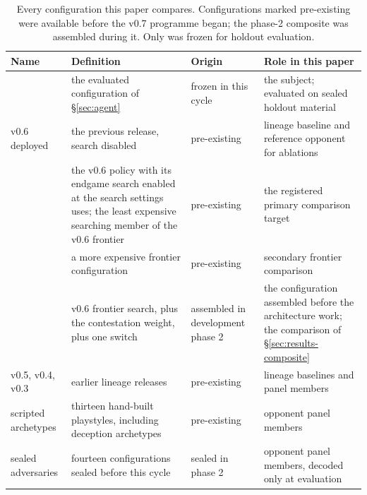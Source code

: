 \begin{table}[!ht]
\centering
\caption{Every configuration this paper compares. Configurations marked pre-existing were available
before the v0.7 programme began; the phase-2 composite was assembled during it. Only \sestina{} was
frozen for holdout evaluation.}
\label{tab:configs}
\tabfont
\begin{tabularx}{\linewidth}{@{}l L l L@{}}
\toprule
Name & Definition & Origin & Role in this paper \\
\midrule
\sestina{} & the evaluated configuration of \S\ref{sec:agent} & frozen in this cycle &
the subject; evaluated on sealed holdout material \\
v0.6 deployed & the previous release, search disabled & pre-existing &
lineage baseline and reference opponent for ablations \\
\fcheap{} & the v0.6 policy with its endgame search enabled at the search settings \sestina{}
uses; the least expensive searching member of the v0.6 frontier & pre-existing &
the registered primary comparison target \\
\fmid{} & a more expensive frontier configuration & pre-existing &
secondary frontier comparison \\
\composite{} & v0.6 frontier search, plus the contestation weight, plus one switch &
assembled in development phase 2 & the configuration assembled before the architecture work; the
comparison of \S\ref{sec:results-composite} \\
v0.5, v0.4, v0.3 & earlier lineage releases & pre-existing & lineage baselines and panel members \\
scripted archetypes & thirteen hand-built playstyles, including deception archetypes & pre-existing &
opponent panel members \\
sealed adversaries & fourteen configurations sealed before this cycle & sealed in phase 2 &
opponent panel members, decoded only at evaluation \\
\bottomrule
\end{tabularx}
\end{table}

